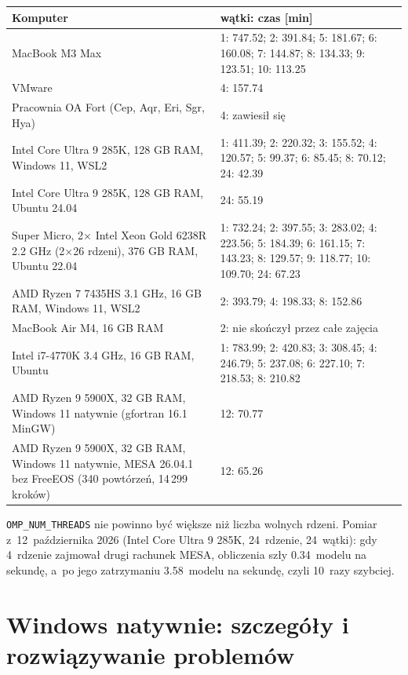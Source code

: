 \documentclass[11pt,a4paper]{article}
\begin{document}
\begin{small}
\begin{longtable}{p{}p{}}
\toprule
\textbf{Komputer} & \textbf{wątki: czas [min]} \\
\midrule
\endhead
MacBook M3 Max & 1: 747.52; 2: 391.84; 5: 181.67; 6: 160.08; 7: 144.87; 8: 134.33; 9: 123.51; 10: 113.25 \\
VMware & 4: 157.74 \\
Pracownia OA Fort (Cep, Aqr, Eri, Sgr, Hya) & 4: zawiesił się \\
Intel Core Ultra 9 285K, 128 GB RAM, Windows 11, WSL2 & 1: 411.39; 2: 220.32; 3: 155.52; 4: 120.57; 5: 99.37; 6: 85.45; 8: 70.12; 24: 42.39 \\
Intel Core Ultra 9 285K, 128 GB RAM, Ubuntu 24.04 & 24: 55.19 \\
Super Micro, 2× Intel Xeon Gold 6238R 2.2 GHz (2×26 rdzeni), 376 GB RAM, Ubuntu 22.04 & 1: 732.24; 2: 397.55; 3: 283.02; 4: 223.56; 5: 184.39; 6: 161.15; 7: 143.23; 8: 129.57; 9: 118.77; 10: 109.70; 24: 67.23 \\
AMD Ryzen 7 7435HS 3.1 GHz, 16 GB RAM, Windows 11, WSL2 & 2: 393.79; 4: 198.33; 8: 152.86 \\
MacBook Air M4, 16 GB RAM & 2: nie skończył przez całe zajęcia \\
Intel i7-4770K 3.4 GHz, 16 GB RAM, Ubuntu & 1: 783.99; 2: 420.83; 3: 308.45; 4: 246.79; 5: 237.08; 6: 227.10; 7: 218.53; 8: 210.82 \\
AMD Ryzen 9 5900X, 32 GB RAM, Windows 11 natywnie (gfortran 16.1 MinGW) & 12: 70.77 \\
AMD Ryzen 9 5900X, 32 GB RAM, Windows 11 natywnie, MESA 26.04.1 bez FreeEOS (340 powtórzeń, 14\,299 kroków) & 12: 65.26 \\
\bottomrule
\end{longtable}
\end{small}

\texttt{OMP\_NUM\_THREADS} nie powinno być większe niż liczba wolnych rdzeni. Pomiar z~12~października
2026 (Intel Core Ultra 9 285K, 24~rdzenie, 24~wątki): gdy 4~rdzenie zajmował drugi rachunek MESA,
obliczenia szły 0.34~modelu na sekundę, a~po jego zatrzymaniu 3.58~modelu na sekundę, czyli
10~razy szybciej.

\appendix
\section{Windows natywnie: szczegóły i rozwiązywanie problemów}\label{app:win}
\end{document}

